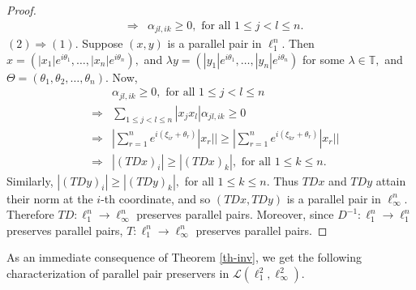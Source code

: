 \documentclass{amsart}
\theoremstyle{definition}
\theoremstyle{remark}
\numberwithin{equation}{section}
\begin{document}
\begin{proof}
\begin{eqnarray*}
		&\Rightarrow & \alpha_{jl,ik}\geq 0,\text{ for all } 1\leq j<l\leq n. 
	\end{eqnarray*}
	$(2)\Rightarrow (1).$ Suppose $(x,y)$ is a parallel pair in $\ell_1^n.$ Then $x=(|x_1|e^{i\theta_1},\ldots, |x_n|e^{i\theta_n}),$ and $\lambda y=(|y_1|e^{i\theta_1},\ldots, |y_n|e^{i\theta_n})$ for some $\lambda\in \mathbb{T},$ and $\Theta=(\theta_1,\theta_2,\ldots,\theta_n).$ Now, 
	\begin{eqnarray*}
		&&	\alpha_{jl,ik}\geq 0,\text{ for all } 1\leq j<l\leq n\\
		&\Rightarrow &\sum_{1\leq j<l\leq n}|x_jx_l |\alpha_{jl,ik}\geq 0\\
		&\Rightarrow &|\sum_{r=1}^ne^{i(\xi_{ir}+\theta_r)}|x_r||\geq   |\sum_{r=1}^ne^{i(\xi_{kr}+\theta_r)}|x_r||\\
		&\Rightarrow &|(TDx)_i|\geq|(TDx)_k|, \text{  for all }1\leq k\leq n.
	\end{eqnarray*}
	Similarly, $|(TDy)_i|\geq|(TDy)_k|,$ for all $1\leq k\leq n.$ Thus $TDx$ and $TDy$ attain their norm at the $i$-th coordinate, and so $(TDx,TDy)$ is a parallel pair in $\ell_\infty^n.$ Therefore $TD:\ell_1^n\to \ell_\infty^n$ preserves parallel pairs. Moreover, since $D^{-1}:\ell_1^n\to \ell_1^n$ preserves parallel pairs, $T:\ell_1^n\to \ell_\infty^n$ preserves parallel pairs.
\end{proof}

As an immediate consequence of Theorem \ref{th-inv}, we  get the following characterization of parallel pair preservers in $\mathcal{L}(\ell_1^2,\ell_\infty^2).$
\end{document}
